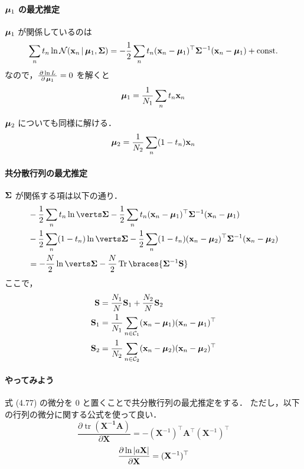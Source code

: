 \paragraph{$\boldsymbol{\mu}_1$ の最尤推定}

$\boldsymbol{\mu}_1$ が関係しているのは
\begin{equation}
  \sum_n t_n \ln {\mathcal{N}}({\mathbf{x}}_n \,|\, \boldsymbol{\mu}_1, \boldsymbol{\Sigma}) = - \frac{1}{2} \sum_n t_n ({\mathbf{x}}_n - \boldsymbol{\mu}_1)^\top \boldsymbol{\Sigma}^{-1} ({\mathbf{x}}_n - \boldsymbol{\mu}_1) + \mathrm{const.}
\end{equation}
なので，$\frac{\,\partial{\, \ln L}\,}{\,\partial{\, \boldsymbol{\mu}_1}\,} = 0$ を解くと
\begin{equation}
  \boldsymbol{\mu}_1 = \frac{1}{N_1} \sum_n t_n {\mathbf{x}}_n
\end{equation}

$\boldsymbol{\mu}_2$ についても同様に解ける．
\begin{equation}
  \boldsymbol{\mu}_2 = \frac{1}{N_2} \sum_n (1 - t_n) {\mathbf{x}}_n
\end{equation}

\paragraph{共分散行列の最尤推定}
$\boldsymbol{\Sigma}$ が関係する項は以下の通り．
\begin{align}
  & - \fhalf \sum_n t_n \ln \abs{\mSigma} - \fhalf \sum_n t_n (\vx_n - \vmu_1)^\top \mSigma^{-1} (\vx_n - \vmu_1) \notag \\
  & - \fhalf \sum_n (1-t_n) \ln \abs{\mSigma} - \fhalf \sum_n (1-t_n) (\vx_n - \vmu_2)^\top \mSigma^{-1} (\vx_n - \vmu_2)  \notag \\ 
  & = -\frac{N}{2} \ln \abs{\mSigma} - \frac{N}{2} \Tr \braces{\mSigma\inv \vS} 
\end{align}
ここで，
\begin{align}
  {\mathbf{S}} & = \frac{N_1}{N} {\mathbf{S}}_1 + \frac{N_2}{N}{\mathbf{S}}_2 \\
  {\mathbf{S}}_1 & = \frac{1}{N_1} \sum_{n \in {\mathcal{C}}_1}({\mathbf{x}}_n - \boldsymbol{\mu}_1)({\mathbf{x}}_n - \boldsymbol{\mu}_1)^\top \\
  {\mathbf{S}}_2 & = \frac{1}{N_2} \sum_{n \in {\mathcal{C}}_2}({\mathbf{x}}_n - \boldsymbol{\mu}_2)({\mathbf{x}}_n - \boldsymbol{\mu}_2)^\top
\end{align}

\paragraph{やってみよう}
式 (4.77) の微分を $0$ と置くことで共分散行列の最尤推定をする．
ただし，以下の行列の微分に関する公式を使って良い．
\[
  \frac {\partial \operatorname {tr} (\mathbf {X^{-1}A} )}{\partial \mathbf {X} } = -(\mathbf {X} ^{-1})^{\top }\mathbf {A} ^{\top }(\mathbf {X} ^{-1})^{\top }
\]
\[
  \frac{\partial \ln |a\mathbf{X}|}{\partial \mathbf{X}} = ({\mathbf{X}}^{-1})^\top
\]

